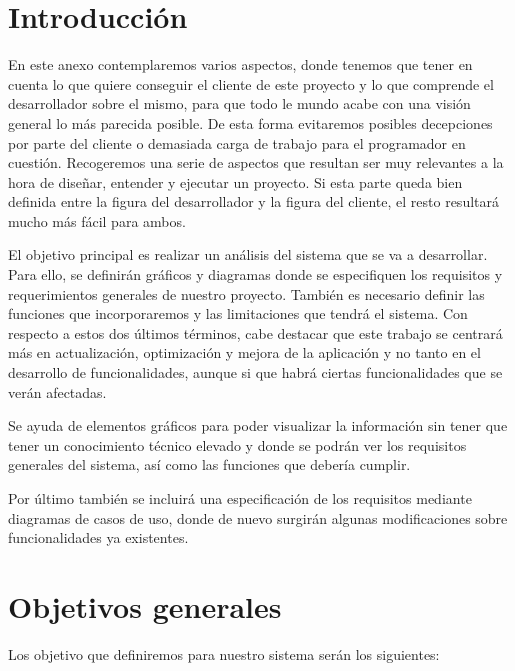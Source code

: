 
\section{Introducción}

En este anexo contemplaremos varios aspectos, donde tenemos que tener en cuenta lo que quiere conseguir el cliente de este proyecto y lo que comprende el desarrollador sobre el mismo, para que todo le mundo acabe con una visión general lo más parecida posible. De esta forma evitaremos posibles decepciones por parte del cliente o demasiada carga de trabajo para el programador en cuestión. Recogeremos una serie de aspectos que resultan ser muy relevantes a la hora de diseñar, entender y ejecutar un proyecto. Si esta parte queda bien definida entre la figura del desarrollador y la figura del cliente, el resto resultará mucho más fácil para ambos.

El objetivo principal es realizar un análisis del sistema que se va a desarrollar. Para ello, se definirán gráficos y diagramas donde se especifiquen los requisitos y requerimientos generales de nuestro proyecto. También es necesario definir las funciones que incorporaremos y las limitaciones que tendrá el sistema. Con respecto a estos dos últimos términos, cabe destacar que este trabajo se centrará más en actualización, optimización y mejora de la aplicación y no tanto en el desarrollo de funcionalidades, aunque si que habrá ciertas funcionalidades que se verán afectadas.

Se ayuda de elementos gráficos para poder visualizar la información sin tener que tener un conocimiento técnico elevado y donde se podrán ver los requisitos generales del sistema, así como las funciones que debería cumplir.

Por último también se incluirá una especificación de los requisitos mediante diagramas de casos de uso, donde de nuevo surgirán algunas modificaciones sobre funcionalidades ya existentes.

\section{Objetivos generales}

Los objetivo que definiremos para nuestro sistema serán los siguientes:


